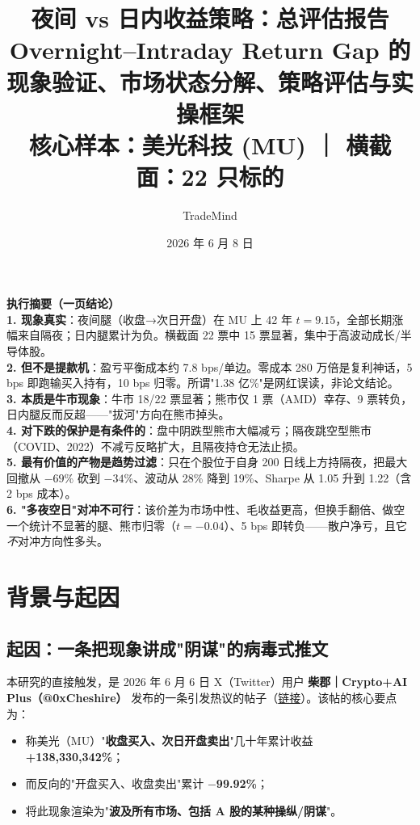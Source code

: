 \documentclass[11pt,a4paper,fontset=none]{ctexart}
\title{\bfseries 夜间 vs 日内收益策略：总评估报告\\
\large Overnight--Intraday Return Gap 的现象验证、市场状态分解、策略评估与实操框架\\[2pt]
\normalsize 核心样本：美光科技 (MU) ｜ 横截面：22 只标的}
\author{TradeMind}
\date{2026 年 6 月 8 日}
\begin{document}
\maketitle

\begin{center}
\colorbox{hl}{\parbox{0.95\textwidth}{\small
\textbf{执行摘要（一页结论）}\\[3pt]
\textbf{1. 现象真实}：夜间腿（收盘→次日开盘）在 MU 上 42 年 $t=9.15$，全部长期涨幅来自隔夜；日内腿累计为负。横截面 22 票中 15 票显著，集中于高波动成长/半导体股。\\[2pt]
\textbf{2. 但不是提款机}：盈亏平衡成本约 7.8 bps/单边。零成本 280 万倍是复利神话，5 bps 即跑输买入持有，10 bps 归零。所谓"1.38 亿\%"是网红误读，非论文结论。\\[2pt]
\textbf{3. 本质是牛市现象}：牛市 18/22 票显著；熊市仅 1 票（AMD）幸存、9 票转负，日内腿反而反超——"拔河"方向在熊市掉头。\\[2pt]
\textbf{4. 对下跌的保护是有条件的}：盘中阴跌型熊市大幅减亏；隔夜跳空型熊市（COVID、2022）不减亏反略扩大，且隔夜持仓无法止损。\\[2pt]
\textbf{5. 最有价值的产物是趋势过滤}：只在个股位于自身 200 日线上方持隔夜，把最大回撤从 $-69\%$ 砍到 $-34\%$、波动从 28\% 降到 19\%、Sharpe 从 1.05 升到 1.22（含 2 bps 成本）。\\[2pt]
\textbf{6. "多夜空日"对冲不可行}：该价差为市场中性、毛收益更高，但换手翻倍、做空一个统计不显著的腿、熊市归零（$t=-0.04$）、5 bps 即转负——散户净亏，且它\emph{不}对冲方向性多头。
}}
\end{center}

\tableofcontents
\newpage

\section{背景与起因}
\subsection{起因：一条把现象讲成"阴谋"的病毒式推文}
本研究的直接触发，是 2026 年 6 月 6 日 X（Twitter）用户 \textbf{柴郡｜Crypto+AI Plus（@0xCheshire）} 发布的一条引发热议的帖子（\href{https://x.com/0xCheshire/status/2063111971013263404}{链接}）。该帖的核心要点为：

\begin{itemize}\itemsep0pt
  \item 称美光（MU）"\textbf{收盘买入、次日开盘卖出}"几十年累计收益 \textbf{+138{,}330{,}342\%}；
  \item 而反向的"开盘买入、收盘卖出"累计 \textbf{$-$99.92\%}；
  \item 将此现象渲染为"\textbf{波及所有市场、包括 A 股的某种操纵/阴谋}"。
\end{itemize}
\end{document}
